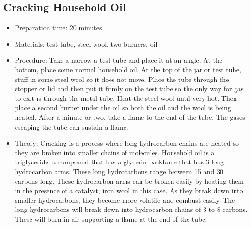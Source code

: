 \subsection{Cracking Household Oil}
\begin{itemize}
\item{Preparation time: 20 minutes}
\item{Materials: test tube, steel wool, two burners, oil}
\item{Procedure: Take a narrow a test tube and place it at an angle. At the bottom, place some normal household oil. At the top of the jar or test tube, stuff in some steel wool so it does not move. Place the tube through the stopper or lid and then put it firmly on the test tube so the only way for gas to exit is through the metal tube. Heat the steel wool until very hot. Then place a second burner under the oil so both the oil and the wool is being heated. After a minute or two, take a flame to the end of the tube. The gases escaping the tube can sustain a flame.}
\item{Theory: Cracking is a process where long hydrocarbon chains are heated so they are broken into smaller chains of molecules. Household oil is a triglyceride: a compound that has a glycerin backbone that has 3 long hydrocarbon arms. These long hydrocarbons range between 15 and 30 carbons long. These hydrocarbon arms can be broken easily by heating them in the presence of a catalyst, iron wool in this case. As they break down into smaller hydrocarbons, they become more volatile and combust easily. The long hydrocarbons will break down into hydrocarbon chains of 3 to 8 carbons. These will burn in air supporting a flame at the end of the tube.}
\end{itemize}

